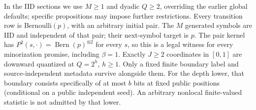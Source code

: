 \documentclass[11pt,letterpaper]{article}
\theoremstyle{definition}\newtheorem{definition}[theorem]{Definition}
\theoremstyle{remark}\newtheorem{remark}[theorem]{Remark}
\begin{document}
In the IID sections we use $M\ge1$ and dyadic $Q\ge2$, overriding the earlier global defaults; specific propositions may impose further restrictions. Every transition row is Bernoulli$(p)$, with an arbitrary initial pair. The $M$ generated symbols are IID and independent of that pair; their next-symbol target is $p$. The pair kernel has $P^2(s,\cdot)=\operatorname{Bern}(p)^{\otimes2}$ for every $s$, so this is a legal witness for every minorization promise, including $\beta=1$. Exactly $J\ge2$ coordinates in $[0,1]$ are downward quantized at $Q=2^h$, $h\ge1$. Only a fixed finite boundary label and source-independent metadata survive alongside them. For the depth lower, that boundary consists specifically of at most $b$ bits at fixed public positions (conditional on a public independent seed). An arbitrary nonlocal finite-valued statistic is not admitted by that lower.
\end{document}
